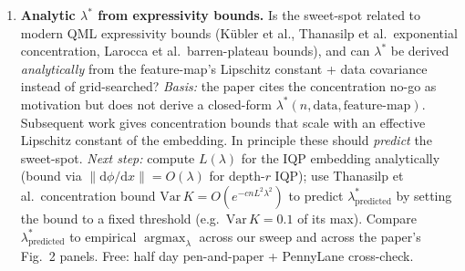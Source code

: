 \begin{enumerate}
\item \textbf{Analytic $\lambda^*$ from expressivity bounds.}
Is the sweet-spot related to modern QML expressivity bounds
(K\"ubler et al., Thanasilp et al.\ exponential concentration, Larocca et al.\
barren-plateau bounds), and can $\lambda^*$ be derived \emph{analytically}
from the feature-map's Lipschitz constant + data covariance instead of
grid-searched?
\emph{Basis:} the paper cites the concentration no-go as motivation but does
not derive a closed-form $\lambda^*(n, \text{data}, \text{feature-map})$.
Subsequent work gives concentration bounds that scale with an effective
Lipschitz constant of the embedding. In principle these should \emph{predict}
the sweet-spot.
\emph{Next step:} compute $L(\lambda)$ for the IQP embedding analytically
(bound via $\|\mathrm{d}\phi/\mathrm{d}x\| = O(\lambda)$ for depth-$r$ IQP);
use Thanasilp et al.\ concentration bound
$\mathrm{Var}\,K = O(e^{-c n L^2 \lambda^2})$ to predict
$\lambda_{\text{predicted}}^*$ by setting the bound to a fixed threshold
(e.g.\ $\mathrm{Var}\,K = 0.1$ of its max). Compare
$\lambda_{\text{predicted}}^*$ to empirical $\operatorname{argmax}_\lambda$
across our sweep and across the paper's Fig.\ 2 panels. Free: half day
pen-and-paper + PennyLane cross-check.

\end{enumerate}
